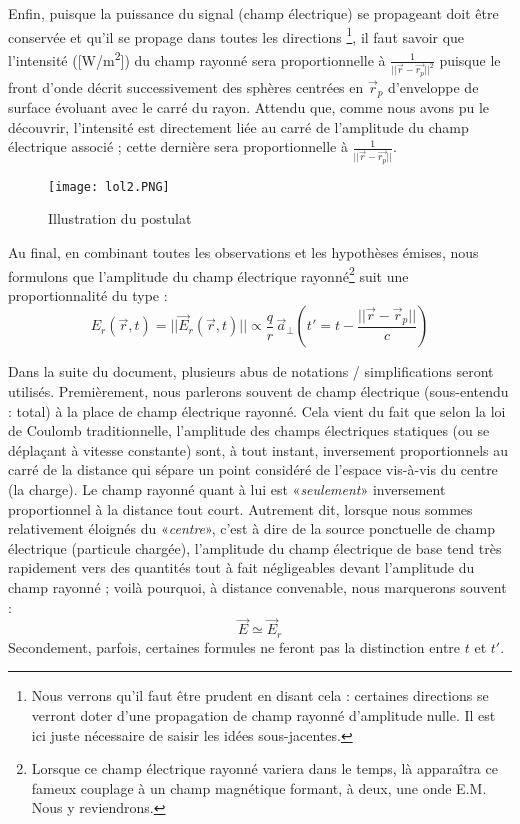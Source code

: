 Enfin, puisque la puissance du signal (champ électrique) se propageant doit être conservée et qu'il se propage dans toutes les directions \footnote{Nous verrons qu'il faut être prudent en disant cela : certaines directions se verront doter d'une propagation de champ rayonné d'amplitude nulle. Il est ici juste nécessaire de saisir les idées sous-jacentes.}, il faut savoir que l'intensité ([\si{W/m^{2}}]) du champ rayonné sera proportionnelle à $\frac{1}{|| \vec{r} - \vec{r_{p}} ||^{2} }$ 
puisque le front d'onde décrit successivement des sphères centrées en $\vec{r}_{p}$ d'enveloppe de surface évoluant avec le carré du rayon. Attendu que, comme nous avons pu le découvrir, l'intensité est directement liée au carré de l'amplitude du champ électrique associé ; cette dernière sera proportionnelle à $\frac{1}{||\vec{r} - \vec{r_{p}}||}$.

\begin{figure}[h]
	\centering
	\texttt{[image: lol2.PNG]}
	\caption{Illustration du postulat}
	\label{fig:yo2}
\end{figure} 

Au final, en combinant toutes les observations et les hypothèses émises, nous formulons que l'amplitude du champ électrique  rayonné\footnote{Lorsque ce champ électrique rayonné variera dans le temps, là apparaîtra ce fameux couplage à un champ magnétique formant, à deux, une onde E.M. Nous y reviendrons.} suit une proportionnalité du type : 
\[ E_{r}(\vec{r},t) = || \vec{E}_{r}(\vec{r},t) || \propto \frac{q}{r}\,\vec{a}_{\perp}\left(t' = t - \frac{||\vec{r}-\vec{r}_{p}||}{c}\right)\]

Dans la suite du document, plusieurs abus de notations / simplifications seront utilisés.
Premièrement, nous parlerons souvent de champ électrique (sous-entendu : total) à la place de champ électrique rayonné. Cela vient du fait que selon la loi de Coulomb traditionnelle, l'amplitude des champs électriques statiques (ou se déplaçant à vitesse constante) sont, à tout instant, inversement proportionnels au carré de la distance qui sépare un point considéré de l'espace vis-à-vis du centre (la charge). Le champ rayonné quant à lui est «\textit{seulement}» inversement proportionnel à la distance tout court. Autrement dit, lorsque nous sommes relativement éloignés du «\textit{centre}», c'est à dire de la source ponctuelle de champ électrique (particule chargée), l'amplitude du champ électrique de base tend très rapidement vers des quantités tout à fait négligeables devant l'amplitude du champ rayonné ; voilà pourquoi, à distance convenable, nous marquerons souvent : \[\vec{E} \simeq \vec{E}_{r}\] 
Secondement, parfois, certaines formules ne feront pas la distinction entre $t$ et $t'$.

